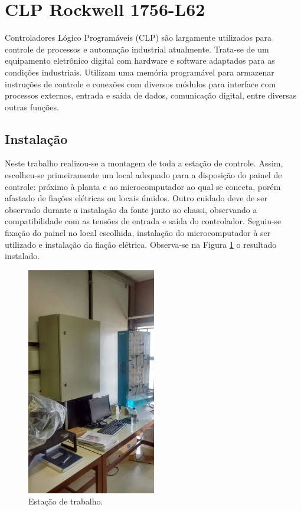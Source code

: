 \section{CLP Rockwell 1756-L62}
Controladores Lógico Programáveis (CLP) são largamente utilizados para controle de processos e automação industrial atualmente. Trata-se de um equipamento eletrônico digital com hardware e software adaptados para as condições industriais. Utilizam uma memória programável para armazenar instruções de controle e conexões com diversos módulos para interface com processos externos, entrada e saída de dados, comunicação digital, entre diversas outras funções.

\subsection{Instalação}
Neste trabalho realizou-se a montagem de toda a estação de controle. Assim, escolheu-se primeiramente um local adequado para a disposição do painel de controle: próximo à planta e ao microcomputador ao qual se conecta, porém afastado de fiações elétricas ou locais úmidos. Outro cuidado deve de ser observado durante a instalação da fonte junto ao chassi, observando a compatibilidade com as tensões de entrada e saída do controlador. Seguiu-se fixação do painel no local escolhida, instalação do microcomputador à ser utilizado e instalação da fiação elétrica. Observa-se na Figura \ref{fig:mesa} o resultado instalado.

\begin{figure}[H]
	\centering
	\includegraphics[height=10cm,keepaspectratio]{figs/mesa.jpg}
	\caption{Estação de trabalho.}
	\label{fig:mesa}
\end{figure}

